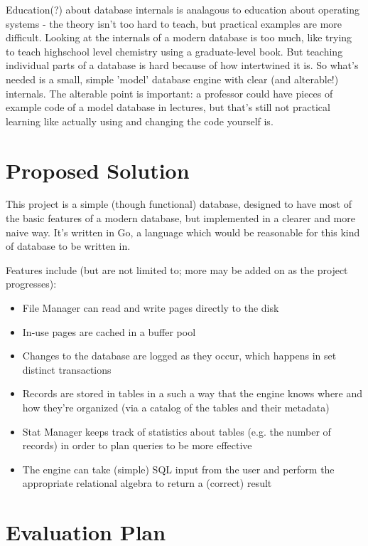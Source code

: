 \documentclass[12pt, oneside]{amsart} %
\begin{document}
Education(?) about database internals is analagous to education about operating systems - the theory isn't too hard to teach, but practical examples are more difficult. Looking at the internals of a modern database is too much, like trying to teach highschool level chemistry using a graduate-level book. But teaching individual parts of a database is hard because of how intertwined it is. So what's needed is a small, simple 'model' database engine with clear (and alterable!) internals. The alterable point is important: a professor could have pieces of example code of a model database in lectures, but that's still not practical learning like actually using and changing the code yourself is. 

\section{Proposed Solution}

This project is a simple (though functional) database, designed to have most of the basic features of a modern database, but implemented in a clearer and more naive way. It's written in Go, a language which would be reasonable for this kind of database to be written in. 

Features include (but are not limited to; more may be added on as the project progresses):
\begin{itemize}
    \item File Manager can read and write pages directly to the disk
    \item In-use pages are cached in a buffer pool 
    \item Changes to the database are logged as they occur, which happens in set distinct transactions
    \item Records are stored in tables in a such a way that the engine knows where and how they're organized (via a catalog of the tables and their metadata)
    \item Stat Manager keeps track of statistics about tables (e.g. the number of records) in order to plan queries to be more effective 
    \item The engine can take (simple) SQL input from the user and perform the appropriate relational algebra to return a (correct) result
\end{itemize}



\section{Evaluation Plan}
\end{document}
